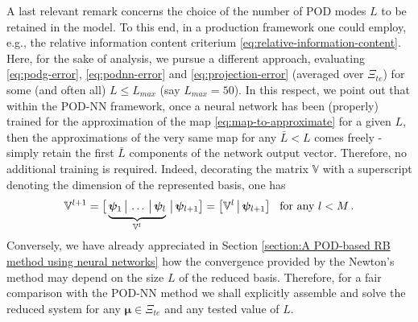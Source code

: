 \documentclass[12pt, a4paper, twoside, openright]{report}
\numberwithin{equation}{chapter}
\theoremstyle{theorem}
\theoremstyle{definition}
\theoremstyle{remark}
\theoremstyle{proposition}
\numberwithin{figure}{chapter}
\newcommand{\bg}[1]{\boldsymbol{#1}}
\begin{document}
		A last relevant remark concerns the choice of the number of POD modes $L$ to be retained in the model. To this end, in a production framework one could employ, e.g., the relative information content criterium \eqref{eq:relative-information-content}. Here, for the sake of analysis, we pursue a different approach, evaluating \eqref{eq:podg-error}, \eqref{eq:podnn-error} and \eqref{eq:projection-error} (averaged over $\Xi_{te}$) for some (and often all) $L \leq L_{max}$ (say $L_{max} = 50$). In this respect, we point out that within the POD-NN framework, once a neural network has been (properly) trained for the approximation of the map \eqref{eq:map-to-approximate} for a given $L$, then the approximations of the very same map for any $\bar{L} < L$ comes freely - simply retain the first $\bar{L}$ components of the network output vector. Therefore, no additional training is required. Indeed, decorating the matrix $\mathbb{V}$ with a superscript denoting the dimension of the represented basis, one has
		\begin{equation*}
			\mathbb{V}^{l+1} = \big[ \underbrace{\bg{\psi}_1 \, \big| \, \ldots \, \big| \, \bg{\psi}_l}_{\mathbb{V}^l} \, \big| \, \bg{\psi}_{l+1} \big] = \big[ \mathbb{V}^l \, \big| \, \bg{\psi}_{l+1} \big] \hspace*{0.3cm} \text{for any $l < M$} \, .
		\end{equation*}
		Conversely, we have already appreciated in Section \ref{section:A POD-based RB method using neural networks} how the convergence provided by the Newton's method may depend on the size $L$ of the reduced basis. Therefore, for a fair comparison with the POD-NN method we shall explicitly assemble and solve the reduced system for any $\bg{\mu} \in \Xi_{te}$ and any tested value of $L$.
		
\end{document}

